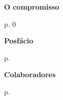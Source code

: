 \thispagestyle{empty}


\begin{vplace}
\begin{centering}
\textbf{O compromisso}

\medskip

p. 0\pageref{compromisso}

\medskip

\textbf{Posfácio}

\medskip

p. \pageref{posfacio}

\medskip

\textbf{Colaboradores}

\medskip

p. \pageref{colaboradores}

\end{centering}
\end{vplace}